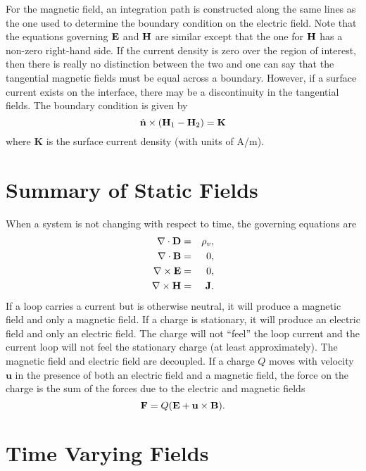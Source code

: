 For the magnetic field, an integration path is constructed along
the same lines as the one used to determine the boundary condition on
the electric field.  Note that the equations governing $\mathbf{E}$ and
$\mathbf{H}$ are similar except that the one for $\mathbf{H}$ has a non-zero
right-hand side.  If the current density is zero over the region of
interest, then there is really no distinction between the two and one
can say that the tangential magnetic fields must be equal across a
boundary.  However, if a surface current exists on the interface,
there may be a discontinuity in the tangential fields.  The boundary
condition is given by
\begin{equation}
 \hat{\mathbf{n}} \times (\mathbf{H}_1 - \mathbf{H}_2)
  = \mathbf{K}
\end{equation}
where $\mathbf{K}$ is the surface current density (with units of A/m).


\section{Summary of Static Fields}

When a system is not changing with respect to time, the governing
equations are
\begin{eqnarray}
  \nabla \cdot \mathbf{D} &=& \rho_v, \\
  \nabla \cdot \mathbf{B} &=& 0, \\
  \nabla \times \mathbf{E} &=& 0, \\
  \nabla \times \mathbf{H} &=& \mathbf{J}. \label{eq:curlHdc}
\end{eqnarray}
If a loop carries a current but is otherwise neutral, it will produce
a magnetic field and only a magnetic field.  If a charge is
stationary, it will produce an electric field and only an electric
field.  The charge will not ``feel'' the loop current and the current
loop will not feel the stationary charge (at least approximately).
The magnetic field and electric field are decoupled.  If a charge $Q$
moves with velocity $\mathbf{u}$ in the presence of both an electric
field and a magnetic field, the force on the charge is the sum of the
forces due to the electric and magnetic fields
\begin{equation}
  \mathbf{F} = Q(\mathbf{E} + \mathbf{u}\times\mathbf{B}).
\end{equation}

\section{Time Varying Fields}

